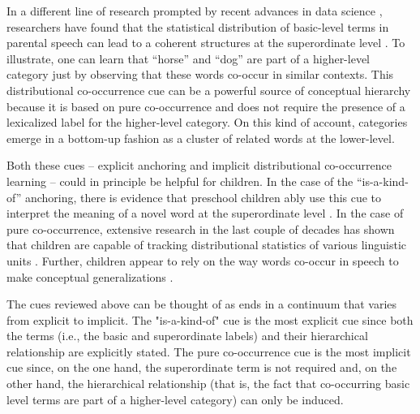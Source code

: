 \documentclass[10pt, letterpaper]{article}
\begin{document}
In a different line of research prompted by recent advances in data
science \cite{landauer1997,mikolov2013}, researchers
have found that the statistical distribution of basic-level terms in
parental speech can lead to a coherent structures at the superordinate
level \cite{huebner 2018,fourtassi2019}.
To
illustrate, one can learn that ``horse'' and ``dog'' are part of a
higher-level category just by observing that these words co-occur in
similar contexts. This distributional co-occurrence cue can be a powerful source of conceptual
hierarchy because it is based on pure co-occurrence and does not require
the presence of a lexicalized label for the higher-level category. On this kind of account, categories emerge in a bottom-up fashion as a cluster of related words at
the lower-level.

Both these cues -- explicit anchoring and implicit distributional co-occurrence learning -- could in principle be helpful for children. In the case of
the ``is-a-kind-of'' anchoring, there is evidence that preschool
children ably use this cue to interpret the meaning of a novel word at
the superordinate level \cite{callanan1989}.
In the case of pure
co-occurrence, extensive research in the last couple of decades has
shown that children are capable of tracking distributional statistics of
various linguistic units \cite{saffran1996}. Further, children
appear to rely on the way words co-occur in speech to make conceptual
generalizations \cite{fisher2011,malten2015}.


The cues reviewed above can be thought of as ends in a continuum that
varies from explicit to implicit. The "is-a-kind-of" cue is the most
explicit cue since both the terms (i.e., the basic and superordinate
labels) and their hierarchical relationship are explicitly stated. The
pure co-occurrence cue is the most implicit cue since, on the one hand,
the superordinate term is not required and, on the other hand, the
hierarchical relationship (that is, the fact that co-occurring basic
level terms are part of a higher-level category) can only be induced.
\end{document}
